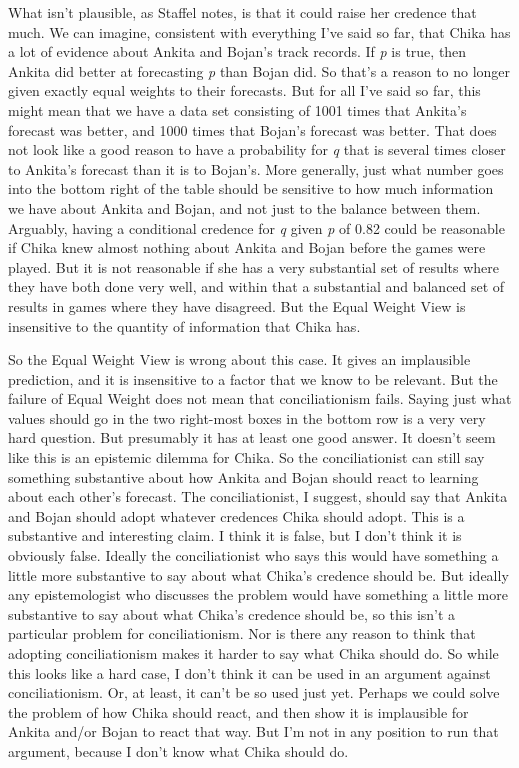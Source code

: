 What isn't plausible, as Staffel notes, is that it could raise her credence that much. We can imagine, consistent with everything I've said so far, that \gls{Chika} has a lot of evidence about \gls{Ankita} and \gls{Bojan}'s track records. If \emph{p} is true, then \gls{Ankita} did better at forecasting \emph{p} than \gls{Bojan} did. So that's a reason to no longer given exactly equal weights to their forecasts. But for all I've said so far, this might mean that we have a data set consisting of 1001 times that \gls{Ankita}'s forecast was better, and 1000 times that \gls{Bojan}'s forecast was better. That does not look like a good reason to have a probability for \emph{q} that is several times closer to \gls{Ankita}'s forecast than it is to \gls{Bojan}'s. More generally, just what number goes into the bottom right of the table should be sensitive to how much information we have about \gls{Ankita} and \gls{Bojan}, and not just to the balance between them. Arguably, having a conditional credence for \emph{q} given \emph{p} of 0.82 could be reasonable if \gls{Chika} knew almost nothing about \gls{Ankita} and \gls{Bojan} before the games were played. But it is not reasonable if she has a very substantial set of results where they have both done very well, and within that a substantial and balanced set of results in games where they have disagreed. But the Equal Weight View is insensitive to the quantity of information that \gls{Chika} has.

So the Equal Weight View is wrong about this case. It gives an implausible prediction, and it is insensitive to a factor that we know to be relevant. But the failure of Equal Weight does not mean that conciliationism fails. Saying just what values should go in the two right-most boxes in the bottom row is a very very hard question. But presumably it has at least one good answer. It doesn't seem like this is an epistemic dilemma for \gls{Chika}. So the conciliationist can still say something substantive about how \gls{Ankita} and \gls{Bojan} should react to learning about each other's forecast. The conciliationist, I suggest, should say that \gls{Ankita} and \gls{Bojan} should adopt whatever credences \gls{Chika} should adopt. This is a substantive and interesting claim. I think it is false, but I don't think it is obviously false. Ideally the conciliationist who says this would have something a little more substantive to say about what \gls{Chika}'s credence should be. But ideally any epistemologist who discusses the problem would have something a little more substantive to say about what \gls{Chika}'s credence should be, so this isn't a particular problem for conciliationism. Nor is there any reason to think that adopting conciliationism makes it harder to say what \gls{Chika} should do. So while this looks like a hard case, I don't think it can be used in an argument against conciliationism. Or, at least, it can't be so used just yet. Perhaps we could solve the problem of how \gls{Chika} should react, and then show it is implausible for \gls{Ankita} and\slash or \gls{Bojan} to react that way. But I'm not in any position to run that argument, because I don't know what \gls{Chika} should do.

